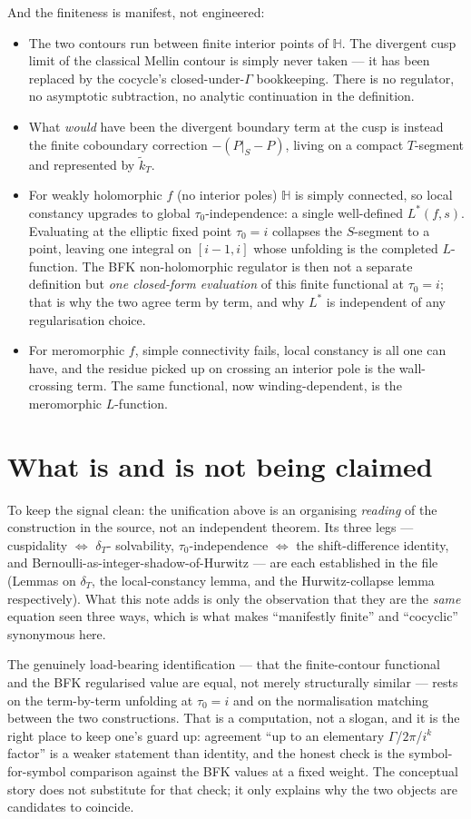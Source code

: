 \documentclass[11pt]{article}
\newcommand{\HH}{\mathbb{H}}
\newcommand{\ktil}{\widetilde{k}_T}
\theoremstyle{plain}
\begin{document}
\noindent And the finiteness is manifest, not engineered:
\begin{itemize}[leftmargin=1.5em]
\item The two contours run between finite interior points of $\HH$. The
divergent cusp limit of the classical Mellin contour is simply never taken
--- it has been replaced by the cocycle's closed-under-$\Gamma$ bookkeeping.
There is no regulator, no asymptotic subtraction, no analytic continuation
in the definition.
\item What \emph{would} have been the divergent boundary term at the cusp is
instead the finite coboundary correction $-(P|_S-P)$, living on a compact
$T$-segment and represented by $\ktil$.
\item For weakly holomorphic $f$ (no interior poles) $\HH$ is simply
connected, so local constancy upgrades to global $\tau_0$-independence: a
single well-defined $L^*(f,s)$. Evaluating at the elliptic fixed point
$\tau_0=i$ collapses the $S$-segment to a point, leaving one integral on
$[i-1,i]$ whose unfolding is the completed $L$-function. The BFK
non-holomorphic regulator is then not a separate definition but
\emph{one closed-form evaluation} of this finite functional at $\tau_0=i$;
that is why the two agree term by term, and why $L^*$ is independent of any
regularisation choice.
\item For meromorphic $f$, simple connectivity fails, local constancy is all
one can have, and the residue picked up on crossing an interior pole is the
wall-crossing term. The same functional, now winding-dependent, is the
meromorphic $L$-function.
\end{itemize}

\section{What is and is not being claimed}

To keep the signal clean: the unification above is an organising
\emph{reading} of the construction in the source, not an independent
theorem. Its three legs --- cuspidality $\Leftrightarrow$ $\delta_T$-
solvability, $\tau_0$-independence $\Leftrightarrow$ the shift-difference
identity, and Bernoulli-as-integer-shadow-of-Hurwitz --- are each
established in the file (Lemmas on $\delta_T$, the local-constancy lemma,
and the Hurwitz-collapse lemma respectively). What this note adds is only
the observation that they are the \emph{same} equation seen three ways,
which is what makes ``manifestly finite'' and ``cocyclic'' synonymous here.

The genuinely load-bearing identification --- that the finite-contour
functional and the BFK regularised value are equal, not merely structurally
similar --- rests on the term-by-term unfolding at $\tau_0=i$ and on the
normalisation matching between the two constructions. That is a computation,
not a slogan, and it is the right place to keep one's guard up: agreement
``up to an elementary $\Gamma$/$2\pi$/$i^k$ factor'' is a weaker statement
than identity, and the honest check is the symbol-for-symbol comparison
against the BFK values at a fixed weight. The conceptual story does not
substitute for that check; it only explains why the two objects are
candidates to coincide.
\end{document}
